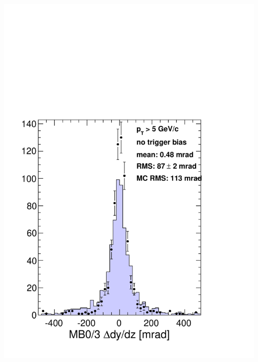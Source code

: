 \documentclass[compress]{beamer}
\begin{document}
\begin{frame}
\begin{columns}
\includegraphics[width=\linewidth]{mb03_dYdZ.pdf}
\end{columns}
\end{frame}
\end{document}
